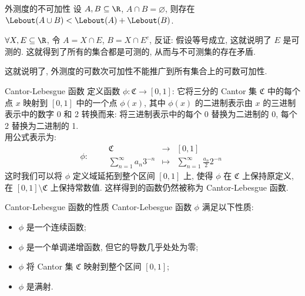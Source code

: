\begin{crl}
    {外测度的不可加性}
    设 \(A,B\subseteq\R\), \(A\cap B=\varnothing\), 则存在 \(\Lebout(A\cup B)<\Lebout(A)+\Lebout(B)\).
\end{crl}
\begin{prf}
    \(\forall X,E\subseteq\R \), 令 \(A=X\cap E\), \(B=X\cap E^c\), 反证: 假设等号成立, 这就说明了 \(E\) 是可测的. 这就得到了所有的集合都是可测的, 从而与不可测集的存在矛盾.
\end{prf}
\begin{rmk}
    这就说明了, 外测度的可数次可加性不能推广到所有集合上的可数可加性.
\end{rmk}
\begin{dfn}
    {Cantor-Lebesgue 函数}
    定义函数 \(\phi:\mathfrak{C}\to [0,1]\): 它将三分的 Cantor 集 \(\mathfrak{C}\) 中的每个点 \(x\) 映射到 \([0,1]\) 中的一个点 \(\phi(x)\), 其中 \(\phi(x)\) 的二进制表示由 \(x\) 的三进制表示中的数字 0 和 2 转换而来: 将三进制表示中的每个 0 替换为二进制的 0, 每个 2 替换为二进制的 1.\\
    用公式表示为:
    \[\phi:\qquad\begin{matrix}
        \mathfrak{C} &\to &[0,1]\\
        \sum_{n=1}^{\infty} a_n 3^{-n} &\mapsto& \sum_{n=1}^{\infty} \frac{a_n}{2} 2^{-n}
    \end{matrix}\]
    这时我们可以将 \(\phi\) 定义域延拓到整个区间 \([0,1]\) 上, 使得 \(\phi\) 在 \(\mathfrak{C}\) 上保持原定义, 在 \([0,1]\setminus\mathfrak{C}\) 上保持常数值. 这样得到的函数仍然被称为 Cantor-Lebesgue 函数.
\end{dfn}
\begin{ppt}
    {Cantor-Lebesgue 函数的性质}
    Cantor-Lebesgue 函数 \(\phi\) 满足以下性质:
    \begin{itemize}
        \item \(\phi\) 是一个连续函数;
        \item \(\phi\) 是一个单调递增函数, 但它的导数几乎处处为零;
        \item \(\phi\) 将 Cantor 集 \(\mathfrak{C}\) 映射到整个区间 \([0,1]\);
        \item \(\phi\) 是满射.
    \end{itemize}
\end{ppt}
